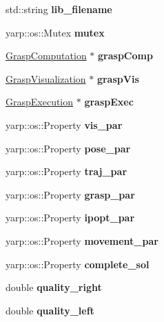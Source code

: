 \begin{DoxyCompactItemize}
\item 
std\+::string {\bfseries lib\+\_\+filename}\label{classGraspingModule_a437d621f1b6e1ce0d5cc1d8958b53fee}

\item 
yarp\+::os\+::\+Mutex {\bfseries mutex}\label{classGraspingModule_ae27bf275f6a5f99728586ae235477683}

\item 
\hyperlink{classGraspComputation}{Grasp\+Computation} $\ast$ {\bfseries grasp\+Comp}\label{classGraspingModule_a2a88d576e1cc46c209d6ff40657f1ddb}

\item 
\hyperlink{classGraspVisualization}{Grasp\+Visualization} $\ast$ {\bfseries grasp\+Vis}\label{classGraspingModule_a98acb57493a68c3ce14f6e89b721aa23}

\item 
\hyperlink{classGraspExecution}{Grasp\+Execution} $\ast$ {\bfseries grasp\+Exec}\label{classGraspingModule_a1c5e0b94e7b086d14ac1bf45db3007f1}

\item 
yarp\+::os\+::\+Property {\bfseries vis\+\_\+par}\label{classGraspingModule_a2d8f2bb7d5263b2df89d7431fe830525}

\item 
yarp\+::os\+::\+Property {\bfseries pose\+\_\+par}\label{classGraspingModule_ac5132578e072a0cd851a888487d4e144}

\item 
yarp\+::os\+::\+Property {\bfseries traj\+\_\+par}\label{classGraspingModule_a4fde085a2948717e65736a75a2786a0d}

\item 
yarp\+::os\+::\+Property {\bfseries grasp\+\_\+par}\label{classGraspingModule_a8665afdacf9d155c465fb7497d202fba}

\item 
yarp\+::os\+::\+Property {\bfseries ipopt\+\_\+par}\label{classGraspingModule_af17896b5afa9de9dbd63caf2bf4e2deb}

\item 
yarp\+::os\+::\+Property {\bfseries movement\+\_\+par}\label{classGraspingModule_a7da5cb35f5a34a18b68023c3d1d3f276}

\item 
yarp\+::os\+::\+Property {\bfseries complete\+\_\+sol}\label{classGraspingModule_af0bdebfd4648ff04bcaf790879897743}

\item 
double {\bfseries quality\+\_\+right}\label{classGraspingModule_aca01f7f0ec39c36623700330b632109f}

\item 
double {\bfseries quality\+\_\+left}\label{classGraspingModule_a6f5ca6d1a1e4efceb05d32fb9c0e10ad}

\end{DoxyCompactItemize}


